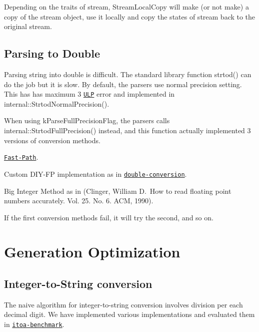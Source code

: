 Depending on the traits of stream, {\ttfamily Stream\+Local\+Copy} will make (or not make) a copy of the stream object, use it locally and copy the states of stream back to the original stream.\hypertarget{md_Cadriciel_Commun_Externe_RapidJSON_doc_internals_ParsingDouble}{}\subsection{Parsing to Double}\label{md_Cadriciel_Commun_Externe_RapidJSON_doc_internals_ParsingDouble}
Parsing string into {\ttfamily double} is difficult. The standard library function {\ttfamily strtod()} can do the job but it is slow. By default, the parsers use normal precision setting. This has has maximum 3 \href{http://en.wikipedia.org/wiki/Unit_in_the_last_place}{\tt U\+LP} error and implemented in {\ttfamily internal\+::\+Strtod\+Normal\+Precision()}.

When using {\ttfamily k\+Parse\+Full\+Precision\+Flag}, the parsers calls {\ttfamily internal\+::\+Strtod\+Full\+Precision()} instead, and this function actually implemented 3 versions of conversion methods.
\begin{DoxyEnumerate}
\item \href{http://www.exploringbinary.com/fast-path-decimal-to-floating-point-conversion/}{\tt Fast-\/\+Path}.
\item Custom D\+I\+Y-\/\+FP implementation as in \href{https://github.com/floitsch/double-conversion}{\tt double-\/conversion}.
\item Big Integer Method as in (Clinger, William D.\+ \+How to read floating point numbers accurately. Vol. 25. No. 6. A\+CM, 1990).
\end{DoxyEnumerate}

If the first conversion methods fail, it will try the second, and so on.\hypertarget{md_Cadriciel_Commun_Externe_RapidJSON_doc_internals_GenerationOptimization}{}\section{Generation Optimization}\label{md_Cadriciel_Commun_Externe_RapidJSON_doc_internals_GenerationOptimization}
\hypertarget{md_Cadriciel_Commun_Externe_RapidJSON_doc_internals_itoa}{}\subsection{Integer-\/to-\/\+String conversion}\label{md_Cadriciel_Commun_Externe_RapidJSON_doc_internals_itoa}
The naive algorithm for integer-\/to-\/string conversion involves division per each decimal digit. We have implemented various implementations and evaluated them in \href{https://github.com/miloyip/itoa-benchmark}{\tt itoa-\/benchmark}.

